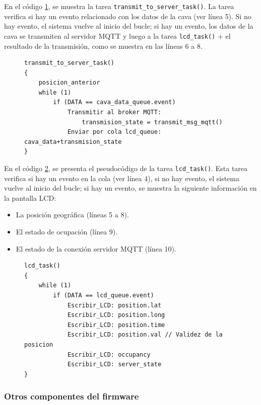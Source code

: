 En el código \ref{cod:transmit_to_server_task}, se muestra la tarea \verb|transmit_to_server_task()|. La tarea verifica si hay un evento relacionado con los datos de la cava (ver línea 5). Si no hay evento, el sistema vuelve al inicio del bucle; si hay un evento, los datos de la cava se transmiten al servidor MQTT y luego a la tarea \verb|lcd_task()| + el resultado de la transmisión, como se muestra en las líneas 6 a 8.

 
\begin{figure}[H]
\begin{lstlisting}
transmit_to_server_task()
{
	posicion_anterior
	while (1)
		if (DATA == cava_data_queue.event)
			Transmitir al broker MQTT: 
				transmision_state = transmit_msg_mqtt()
			Enviar por cola lcd_queue: cava_data+transmision_state
}

\end{lstlisting}
\label{cod:transmit_to_server_task}
\end{figure}



En el código \ref{cod:lcd_task}, se presenta el pseudocódigo de la tarea \verb|lcd_task()|. Esta tarea verifica si hay un evento en la cola (ver línea 4), si no hay evento, el sistema vuelve al inicio del bucle; si hay un evento, se muestra la siguiente información en la pantalla LCD: 

	\begin{itemize}
	\item La posición geográfica (líneas 5 a 8).
	\item El estado de ocupación (línea 9). 
	\item El estado de la conexión servidor MQTT (línea 10). 
	\end{itemize}

 
\begin{figure}[H]
\begin{lstlisting} 
lcd_task()
{
	while (1)
		if (DATA == lcd_queue.event)
			Escribir_LCD: position.lat
			Escribir_LCD: position.long
			Escribir_LCD: position.time
			Escribir_LCD: position.val // Validez de la posicion
			Escribir_LCD: occupancy
			Escribir_LCD: server_state
}

\end{lstlisting}
\label{cod:lcd_task}
\end{figure}


\subsubsection{Otros componentes del firmware}

